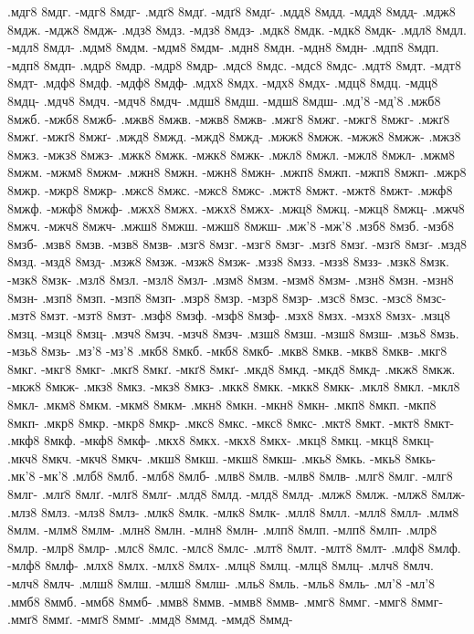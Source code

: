 {.мдг8 8мдг. -мдг8 8мдг-
.мдґ8 8мдґ. -мдґ8 8мдґ-
.мдд8 8мдд. -мдд8 8мдд-
.мдж8 8мдж. -мдж8 8мдж-
.мдз8 8мдз. -мдз8 8мдз-
.мдк8 8мдк. -мдк8 8мдк-
.мдл8 8мдл. -мдл8 8мдл-
.мдм8 8мдм. -мдм8 8мдм-
.мдн8 8мдн. -мдн8 8мдн-
.мдп8 8мдп. -мдп8 8мдп-
.мдр8 8мдр. -мдр8 8мдр-
.мдс8 8мдс. -мдс8 8мдс-
.мдт8 8мдт. -мдт8 8мдт-
.мдф8 8мдф. -мдф8 8мдф-
.мдх8 8мдх. -мдх8 8мдх-
.мдц8 8мдц. -мдц8 8мдц-
.мдч8 8мдч. -мдч8 8мдч-
.мдш8 8мдш. -мдш8 8мдш-
.мд'8 -мд'8
.мжб8 8мжб. -мжб8 8мжб-
.мжв8 8мжв. -мжв8 8мжв-
.мжг8 8мжг. -мжг8 8мжг-
.мжґ8 8мжґ. -мжґ8 8мжґ-
.мжд8 8мжд. -мжд8 8мжд-
.мжж8 8мжж. -мжж8 8мжж-
.мжз8 8мжз. -мжз8 8мжз-
.мжк8 8мжк. -мжк8 8мжк-
.мжл8 8мжл. -мжл8 8мжл-
.мжм8 8мжм. -мжм8 8мжм-
.мжн8 8мжн. -мжн8 8мжн-
.мжп8 8мжп. -мжп8 8мжп-
.мжр8 8мжр. -мжр8 8мжр-
.мжс8 8мжс. -мжс8 8мжс-
.мжт8 8мжт. -мжт8 8мжт-
.мжф8 8мжф. -мжф8 8мжф-
.мжх8 8мжх. -мжх8 8мжх-
.мжц8 8мжц. -мжц8 8мжц-
.мжч8 8мжч. -мжч8 8мжч-
.мжш8 8мжш. -мжш8 8мжш-
.мж'8 -мж'8
.мзб8 8мзб. -мзб8 8мзб-
.мзв8 8мзв. -мзв8 8мзв-
.мзг8 8мзг. -мзг8 8мзг-
.мзґ8 8мзґ. -мзґ8 8мзґ-
.мзд8 8мзд. -мзд8 8мзд-
.мзж8 8мзж. -мзж8 8мзж-
.мзз8 8мзз. -мзз8 8мзз-
.мзк8 8мзк. -мзк8 8мзк-
.мзл8 8мзл. -мзл8 8мзл-
.мзм8 8мзм. -мзм8 8мзм-
.мзн8 8мзн. -мзн8 8мзн-
.мзп8 8мзп. -мзп8 8мзп-
.мзр8 8мзр. -мзр8 8мзр-
.мзс8 8мзс. -мзс8 8мзс-
.мзт8 8мзт. -мзт8 8мзт-
.мзф8 8мзф. -мзф8 8мзф-
.мзх8 8мзх. -мзх8 8мзх-
.мзц8 8мзц. -мзц8 8мзц-
.мзч8 8мзч. -мзч8 8мзч-
.мзш8 8мзш. -мзш8 8мзш-
.мзь8 8мзь. -мзь8 8мзь-
.мз'8 -мз'8
.мкб8 8мкб. -мкб8 8мкб-
.мкв8 8мкв. -мкв8 8мкв-
.мкг8 8мкг. -мкг8 8мкг-
.мкґ8 8мкґ. -мкґ8 8мкґ-
.мкд8 8мкд. -мкд8 8мкд-
.мкж8 8мкж. -мкж8 8мкж-
.мкз8 8мкз. -мкз8 8мкз-
.мкк8 8мкк. -мкк8 8мкк-
.мкл8 8мкл. -мкл8 8мкл-
.мкм8 8мкм. -мкм8 8мкм-
.мкн8 8мкн. -мкн8 8мкн-
.мкп8 8мкп. -мкп8 8мкп-
.мкр8 8мкр. -мкр8 8мкр-
.мкс8 8мкс. -мкс8 8мкс-
.мкт8 8мкт. -мкт8 8мкт-
.мкф8 8мкф. -мкф8 8мкф-
.мкх8 8мкх. -мкх8 8мкх-
.мкц8 8мкц. -мкц8 8мкц-
.мкч8 8мкч. -мкч8 8мкч-
.мкш8 8мкш. -мкш8 8мкш-
.мкь8 8мкь. -мкь8 8мкь-
.мк'8 -мк'8
.млб8 8млб. -млб8 8млб-
.млв8 8млв. -млв8 8млв-
.млг8 8млг. -млг8 8млг-
.млґ8 8млґ. -млґ8 8млґ-
.млд8 8млд. -млд8 8млд-
.млж8 8млж. -млж8 8млж-
.млз8 8млз. -млз8 8млз-
.млк8 8млк. -млк8 8млк-
.млл8 8млл. -млл8 8млл-
.млм8 8млм. -млм8 8млм-
.млн8 8млн. -млн8 8млн-
.млп8 8млп. -млп8 8млп-
.млр8 8млр. -млр8 8млр-
.млс8 8млс. -млс8 8млс-
.млт8 8млт. -млт8 8млт-
.млф8 8млф. -млф8 8млф-
.млх8 8млх. -млх8 8млх-
.млц8 8млц. -млц8 8млц-
.млч8 8млч. -млч8 8млч-
.млш8 8млш. -млш8 8млш-
.мль8 8мль. -мль8 8мль-
.мл'8 -мл'8
.ммб8 8ммб. -ммб8 8ммб-
.ммв8 8ммв. -ммв8 8ммв-
.ммг8 8ммг. -ммг8 8ммг-
.ммґ8 8ммґ. -ммґ8 8ммґ-
.ммд8 8ммд. -ммд8 8ммд-
}
